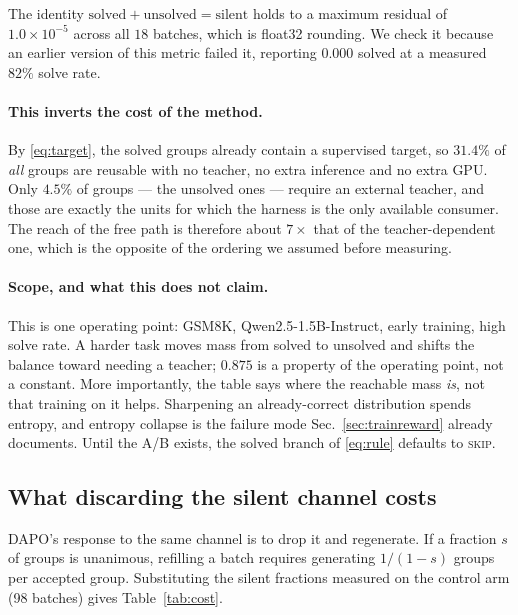 The identity $\text{solved} + \text{unsolved} = \text{silent}$ holds to a maximum residual of
$1.0\times10^{-5}$ across all $18$ batches, which is float32 rounding. We check it because an
earlier version of this metric failed it, reporting $0.000$ solved at a measured $82\%$ solve
rate.

\paragraph{This inverts the cost of the method.} By \eqref{eq:target}, the solved groups
already contain a supervised target, so $31.4\%$ of \emph{all} groups are reusable with no
teacher, no extra inference and no extra GPU. Only $4.5\%$ of groups --- the unsolved ones
--- require an external teacher, and those are exactly the units for which the harness is the
only available consumer. The reach of the free path is therefore about $7\times$ that of the
teacher-dependent one, which is the opposite of the ordering we assumed before measuring.

\paragraph{Scope, and what this does not claim.} This is one operating point: GSM8K,
Qwen2.5-1.5B-Instruct, early training, high solve rate. A harder task moves mass from solved
to unsolved and shifts the balance toward needing a teacher; $0.875$ is a property of the
operating point, not a constant. More importantly, the table says where the reachable mass
\emph{is}, not that training on it helps. Sharpening an already-correct distribution spends
entropy, and entropy collapse is the failure mode Sec.~\ref{sec:trainreward} already
documents. Until the A/B exists, the solved branch of \eqref{eq:rule} defaults to
\textsc{skip}.

\subsection{What discarding the silent channel costs}
\label{sec:cost}

DAPO's response to the same channel is to drop it and regenerate. If a fraction $s$ of groups
is unanimous, refilling a batch requires generating $1/(1-s)$ groups per accepted group.
Substituting the silent fractions measured on the control arm (98 batches) gives
Table~\ref{tab:cost}.

